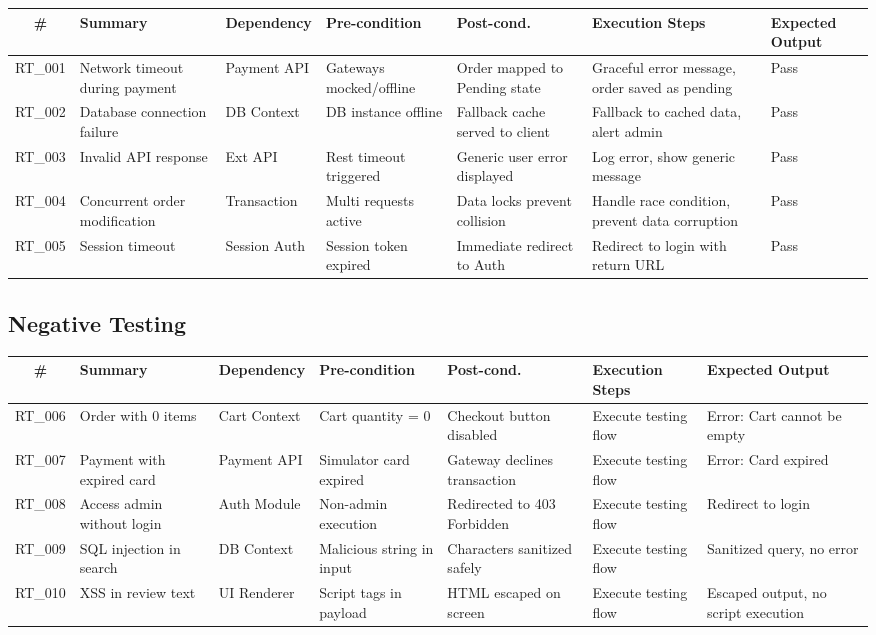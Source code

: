 \documentclass[12pt,a4paper]{report}
\begin{document}
\begin{longtable}{|c|p{1.8cm}|p{1.4cm}|p{1.8cm}|p{1.8cm}|p{2.2cm}|p{1.6cm}|}
\hline
\textbf{\#} & \textbf{Summary} & \textbf{Dependency} & \textbf{Pre-condition} & \textbf{Post-cond.} & \textbf{Execution Steps} & \textbf{Expected Output} \\
\hline
\endfirsthead
RT\_001 & Network timeout during payment & Payment API & Gateways mocked/offline & Order mapped to Pending state & Graceful error message, order saved as pending & Pass \\
\hline
RT\_002 & Database connection failure & DB Context & DB instance offline & Fallback cache served to client & Fallback to cached data, alert admin & Pass \\
\hline
RT\_003 & Invalid API response & Ext API & Rest timeout triggered & Generic user error displayed & Log error, show generic message & Pass \\
\hline
RT\_004 & Concurrent order modification & Transaction & Multi requests active & Data locks prevent collision & Handle race condition, prevent data corruption & Pass \\
\hline
RT\_005 & Session timeout & Session Auth & Session token expired & Immediate redirect to Auth & Redirect to login with return URL & Pass \\
\hline
\end{longtable}

\subsection{Negative Testing}

\begin{longtable}{|c|p{1.8cm}|p{1.4cm}|p{1.8cm}|p{1.8cm}|p{2.2cm}|p{1.6cm}|}
\hline
\textbf{\#} & \textbf{Summary} & \textbf{Dependency} & \textbf{Pre-condition} & \textbf{Post-cond.} & \textbf{Execution Steps} & \textbf{Expected Output} \\
\hline
\endfirsthead
RT\_006 & Order with 0 items & Cart Context & Cart quantity = 0 & Checkout button disabled & Execute testing flow & Error: Cart cannot be empty \\
\hline
RT\_007 & Payment with expired card & Payment API & Simulator card expired & Gateway declines transaction & Execute testing flow & Error: Card expired \\
\hline
RT\_008 & Access admin without login & Auth Module & Non-admin execution & Redirected to 403 Forbidden & Execute testing flow & Redirect to login \\
\hline
RT\_009 & SQL injection in search & DB Context & Malicious string in input & Characters sanitized safely & Execute testing flow & Sanitized query, no error \\
\hline
RT\_010 & XSS in review text & UI Renderer & Script tags in payload & HTML escaped on screen & Execute testing flow & Escaped output, no script execution \\
\hline
\end{longtable}
\end{document}
